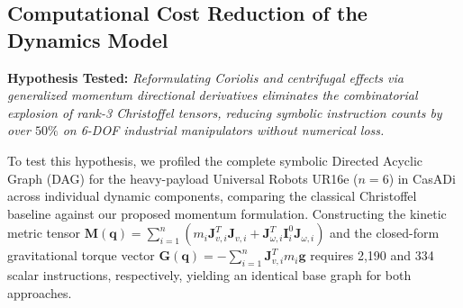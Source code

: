 \documentclass[fleqn,10pt]{article}
\begin{document}
\subsection{Computational Cost Reduction of the Dynamics Model}

\noindent\textbf{Hypothesis Tested:} \textit{Reformulating Coriolis and centrifugal effects via generalized momentum directional derivatives eliminates the combinatorial explosion of rank-3 Christoffel tensors, reducing symbolic instruction counts by over $50\%$ on 6-DOF industrial manipulators without numerical loss.}

To test this hypothesis, we profiled the complete symbolic Directed Acyclic Graph (DAG) for the heavy-payload Universal Robots UR16e ($n=6$) in CasADi across individual dynamic components, comparing the classical Christoffel baseline against our proposed momentum formulation. Constructing the kinetic metric tensor $\bm{M}(\bm{q}) = \sum_{i=1}^n (m_i \bm{J}_{v,i}^T \bm{J}_{v,i} + \bm{J}_{\omega,i}^T \bm{I}_i^0 \bm{J}_{\omega,i})$ and the closed-form gravitational torque vector $\bm{G}(\bm{q}) = -\sum_{i=1}^n \bm{J}_{v,i}^T m_i \bm{g}$ requires 2,190 and 334 scalar instructions, respectively, yielding an identical base graph for both approaches.
\end{document}
